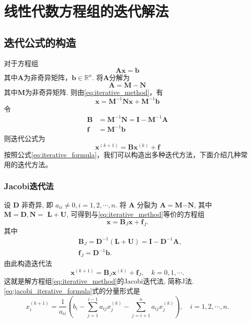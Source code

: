 \section{线性代数方程组的迭代解法}

\subsection{迭代公式的构造}

对于方程组
\begin{equation}\label{eq:iterative_method}
    \boldsymbol{A}\boldsymbol{x}=\boldsymbol{b}
\end{equation}
其中$\boldsymbol{A}$为非奇异矩阵，$\boldsymbol{b}\in\mathbb{R}^n$. 将$\boldsymbol{A}$分解为
\[
    \boldsymbol{A}=\boldsymbol{M}-\boldsymbol{N}
\]
其中$\boldsymbol{M}$为非奇异矩阵. 则由\ref{eq:iterative_method}，有
\begin{equation}\label{eq:iterative_method_decomposition}
    \boldsymbol{x}=\boldsymbol{M}^{-1}\boldsymbol{N}\boldsymbol{x}+\boldsymbol{M}^{-1}\boldsymbol{b}
\end{equation}
令
\begin{align*}
    \boldsymbol{B} & =\boldsymbol{M}^{-1}\boldsymbol{N}=\boldsymbol{I}-\boldsymbol{M}^{-1}\boldsymbol{A} \\
    \boldsymbol{f} & =\boldsymbol{M}^{-1}\boldsymbol{b}
\end{align*}
则迭代公式为
\begin{equation}\label{eq:iterative_formula}
    \boldsymbol{x}^{(k+1)}=\boldsymbol{B}\boldsymbol{x}^{(k)}+\boldsymbol{f}
\end{equation}
按照公式\ref{eq:iterative_formula}，我们可以构造出多种迭代方法，下面介绍几种常用的迭代方法。
\subsubsection{Jacobi迭代法}
设 $\boldsymbol{D}$ 非奇异, 即 $a_{i i} \neq 0, i=1,2, \cdots, n$. 将 $\boldsymbol{A}$ 分裂为 $\boldsymbol{A}=\boldsymbol{M} \boldsymbol{-} \boldsymbol{N}$, 其中 $\boldsymbol{M}=\boldsymbol{D}, \boldsymbol{N}=$ $\boldsymbol{L}+\boldsymbol{U}$, 可得到与\ref{eq:iterative_method}等价的方程组
$$
    \boldsymbol{x}=\boldsymbol{B}_J \boldsymbol{x}+\boldsymbol{f}_J .
$$
其中
$$
    \begin{aligned}
         & \boldsymbol{B}_J=\boldsymbol{D}^{-1}(\boldsymbol{L}+\boldsymbol{U})=\boldsymbol{I}-\boldsymbol{D}^{-1} \boldsymbol{A}, \\
         & \boldsymbol{f}_J=\boldsymbol{D}^{-1} \boldsymbol{b} .
    \end{aligned}
$$
由此构造迭代法
\begin{equation}\label{eq:jacobi_iterative_formula}
    \boldsymbol{x}^{(k+1)}=\boldsymbol{B}_J \boldsymbol{x}^{(k)}+\boldsymbol{f}_J, \quad k=0,1, \cdots .
\end{equation}
这就是解方程组\ref{eq:iterative_method}的Jacobi迭代法, 简称J法. \ref{eq:jacobi_iterative_formula}式的分量形式是
\begin{equation}\label{eq:jacobi_iterative_formula_component}
    x_i^{(k+1)}=\frac{1}{a_{i i}}\left(b_i-\sum_{j=1}^{i-1} a_{i j} x_j^{(k)}-\sum_{j=i+1}^n a_{i j} x_j^{(k)}\right), \quad i=1,2, \cdots, n .
\end{equation}
